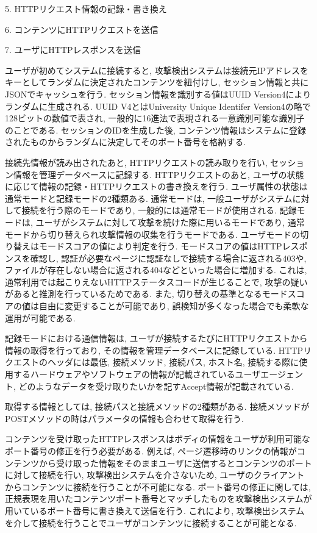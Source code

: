 \documentclass[submit,techrep,noauthor]{ipsj}
\begin{document}
5. HTTPリクエスト情報の記録・書き換え\par
6. コンテンツにHTTPリクエストを送信\par
7. ユーザにHTTPレスポンスを送信\par
\par
\vspace{1pc}
ユーザが初めてシステムに接続すると, 攻撃検出システムは接続元IPアドレスをキーとしてランダムに決定されたコンテンツを紐付けし, セッション情報と共にJSONでキャッシュを行う. セッション情報を識別する値はUUID Version4\cite{label14}によりランダムに生成される. UUID V4とはUniversity Unique Identifer Version4の略で128ビットの数値で表され, 一般的に16進法で表現される一意識別可能な識別子のことである. セッションのIDを生成した後, コンテンツ情報はシステムに登録されたものからランダムに決定してそのポート番号を格納する.
\par
接続先情報が読み出されたあと, HTTPリクエストの読み取りを行い, セッション情報を管理データベースに記録する. HTTPリクエストのあと, ユーザの状態に応じて情報の記録・HTTPリクエストの書き換えを行う. ユーザ属性の状態は通常モードと記録モードの2種類ある. 通常モードは, 一般ユーザがシステムに対して接続を行う際のモードであり, 一般的には通常モードが使用される. 記録モードは, ユーザがシステムに対して攻撃を続けた際に用いるモードであり, 通常モードから切り替えられ攻撃情報の収集を行うモードである. ユーザモードの切り替えはモードスコアの値により判定を行う. モードスコアの値はHTTPレスポンスを確認し, 認証が必要なページに認証なしで接続する場合に返される403や, ファイルが存在しない場合に返される404などといった場合に増加する. これは, 通常利用では起こりえないHTTPステータスコードが生じることで, 攻撃の疑いがあると推測を行っているためである. また, 切り替えの基準となるモードスコアの値は自由に変更することが可能であり, 誤検知が多くなった場合でも柔軟な運用が可能である.\par
記録モードにおける通信情報は, ユーザが接続するたびにHTTPリクエストから情報の取得を行っており, その情報を管理データベースに記録している. HTTPリクエストのヘッダには最低, 接続メソッド, 接続パス, ホスト名, 接続する際に使用するハードウェアやソフトウェアの情報が記載されているユーザエージェント, どのようなデータを受け取りたいかを記すAccept情報が記載されている.\par
取得する情報としては, 接続パスと接続メソッドの2種類がある. 接続メソッドがPOSTメソッドの時はパラメータの情報も合わせて取得を行う. \par
コンテンツを受け取ったHTTPレスポンスはボディの情報をユーザが利用可能なポート番号の修正を行う必要がある. 例えば, ページ遷移時のリンクの情報がコンテンツから受け取った情報をそのままユーザに送信するとコンテンツのポートに対して接続を行い, 攻撃検出システムを介さないため, ユーザのクライアントからコンテンツに接続を行うことが不可能になる. ポート番号の修正に関しては, 正規表現を用いたコンテンツポート番号とマッチしたものを攻撃検出システムが用いているポート番号に書き換えて送信を行う. これにより, 攻撃検出システムを介して接続を行うことでユーザがコンテンツに接続することが可能となる.
\end{document}
